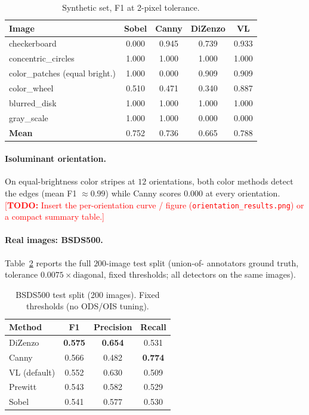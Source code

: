 \documentclass[11pt,a4paper]{article}
\newcommand{\todo}[1]{\textcolor{red}{[\textbf{TODO:} #1]}}
\theoremstyle{plain}
\theoremstyle{definition}
\begin{document}
\begin{table}[h]
\centering
\caption{Synthetic set, F1 at 2-pixel tolerance.}
\label{tab:synth}
\begin{tabular}{lcccc}
\toprule
Image & Sobel & Canny & DiZenzo & VL \\
\midrule
checkerboard                     & 0.000 & 0.945 & 0.739 & 0.933 \\
concentric\_circles              & 1.000 & 1.000 & 1.000 & 1.000 \\
color\_patches (equal bright.)   & 1.000 & 0.000 & 0.909 & 0.909 \\
color\_wheel                     & 0.510 & 0.471 & 0.340 & 0.887 \\
blurred\_disk                    & 1.000 & 1.000 & 1.000 & 1.000 \\
gray\_scale                      & 1.000 & 1.000 & 0.000 & 0.000 \\
\midrule
\textbf{Mean}                    & 0.752 & 0.736 & 0.665 & 0.788 \\
\bottomrule
\end{tabular}
\end{table}

\paragraph{Isoluminant orientation.}
On equal-brightness color stripes at $12$ orientations, both color methods
detect the edges (mean F1 $\approx 0.99$) while Canny scores $0.000$ at every
orientation. \todo{Insert the per-orientation curve / figure
(\texttt{orientation\_results.png}) or a compact summary table.}

\paragraph{Real images: BSDS500.}
Table~\ref{tab:bsds} reports the full $200$-image test split (union-of-
annotators ground truth, tolerance $0.0075\times\text{diagonal}$, fixed
thresholds; all detectors on the same images).

\begin{table}[h]
\centering
\caption{BSDS500 test split (200 images). Fixed thresholds (no ODS/OIS tuning).}
\label{tab:bsds}
\begin{tabular}{lccc}
\toprule
Method & F1 & Precision & Recall \\
\midrule
DiZenzo        & \textbf{0.575} & \textbf{0.654} & 0.531 \\
Canny          & 0.566 & 0.482 & \textbf{0.774} \\
VL (default)   & 0.552 & 0.630 & 0.509 \\
Prewitt        & 0.543 & 0.582 & 0.529 \\
Sobel          & 0.541 & 0.577 & 0.530 \\
\bottomrule
\end{tabular}
\end{table}
\end{document}

